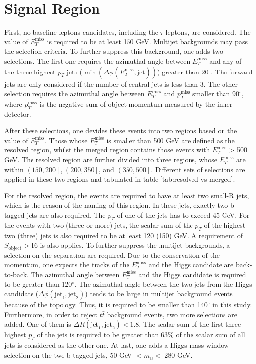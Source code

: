 \documentclass[class=NCU_thesis, crop=false]{standalone}
\begin{document}
\section{Signal Region}\label{SR}
	First, no baseline leptons candidates, including the $\tau$-leptons, are considered. The value of $E_T^{\mathrm{miss}}$ is required to be at least 150 GeV. Multijet backgrounds may pass the selection criteria. To further suppress this background, one adds two selections. The first one requires the azimuthal angle between $E_T^{\mathrm{miss}}$ and any of the three highest-$p_T$ jets ($\min(\Delta \phi(E_T^{\mathrm{miss}}, \mathrm{jet}))$) greater than 20$^\circ$. The forward jets are only considered if the number of central jets is less than 3. The other selection requires the azimuthal angle between $E_T^{\mathrm{miss}}$ and $p_T^{\mathrm{miss}}$ smaller than 90$^\circ$, where $p_T^{\mathrm{miss}}$ is the negative sum of object momentum measured by the inner detector.

	After these selections, one devides these events into two regions based on the value of $E_T^{\mathrm{miss}}$. Those whose $E_T^{\mathrm{miss}}$ is smaller than 500 GeV are defined as the resolved region, whilst the merged region contains those events with $E_T^{\mathrm{miss}}$ > 500 GeV. The resolved region are further divided into three regions, whose $E_T^{\mathrm{miss}}$ are within $\left(150, 200\right]$, $\left(200, 350\right]$, and $\left(350, 500\right]$. Different sets of selections are applied in these two regions and tabulated in table \ref{tab:resolved vs merged}.

	For the resolved region, the events are required to have at least two small-R jets, which is the reason of the naming of this region. In these jets, exactly two b-tagged jets are also required. The $p_T$ of one of the jets has to exceed 45 GeV. For the events with two (three or more) jets, the scalar sum of the $p_T$ of the highest two (three) jets is also required to be at least 120 (150) GeV. A requirement of $S_{\mathrm{object}} > 16$ is also applies. To further suppress the multijet backgrounds, a selection on the separation are required. Due to the conservation of the momentum, one expects the tracks of the $E_T^{\mathrm{miss}}$ and the Higgs candidate are back-to-back. The azimuthal angle between $E_T^{\mathrm{miss}}$ and the Higgs candidate is required to be greater than 120$^\circ$. The azimuthal angle between the two jets from the Higgs candidate ($\Delta \phi(\mathrm{jet}_1, \mathrm{jet}_2)$) tends to be large in multijet background events because of the topology. Thus, it is required to be smaller than 140$^\circ$ in this study. Furthermore, in order to reject $t\bar{t}$ background events, two more selections are added. One of them is $\Delta R(\mathrm{jet}_1, \mathrm{jet}_2) < 1.8$. The scalar sum of the first three highest $p_T$ of the jets is required to be greater than 63\% of the scalar sum of all jets is considered as the other one. At last, one adds a Higgs mass window selection on the two b-tagged jets, 50 GeV $< m_{\mathrm{jj}} <$ 280 GeV.
	
\end{document}
